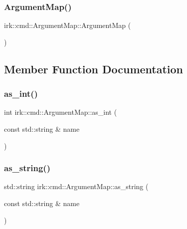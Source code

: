 \subsubsection{\texorpdfstring{Argument\+Map()}{ArgumentMap()}}
{\footnotesize\ttfamily irk\+::cmd\+::\+Argument\+Map\+::\+Argument\+Map (\begin{DoxyParamCaption}{ }\end{DoxyParamCaption})\hspace{0.3cm}{\ttfamily [inline]}}



\subsection{Member Function Documentation}
\mbox{\label{classirk_1_1cmd_1_1ArgumentMap_acf51abb8670b32047edf8e804103bdfa}} 
\subsubsection{\texorpdfstring{as\+\_\+int()}{as\_int()}}
{\footnotesize\ttfamily int irk\+::cmd\+::\+Argument\+Map\+::as\+\_\+int (\begin{DoxyParamCaption}\item[{const std\+::string \&}]{name }\end{DoxyParamCaption})\hspace{0.3cm}{\ttfamily [inline]}}

\mbox{\label{classirk_1_1cmd_1_1ArgumentMap_a11986847959703d2390b85118342837d}} 
\subsubsection{\texorpdfstring{as\+\_\+string()}{as\_string()}}
{\footnotesize\ttfamily std\+::string irk\+::cmd\+::\+Argument\+Map\+::as\+\_\+string (\begin{DoxyParamCaption}\item[{const std\+::string \&}]{name }\end{DoxyParamCaption})\hspace{0.3cm}{\ttfamily [inline]}}

